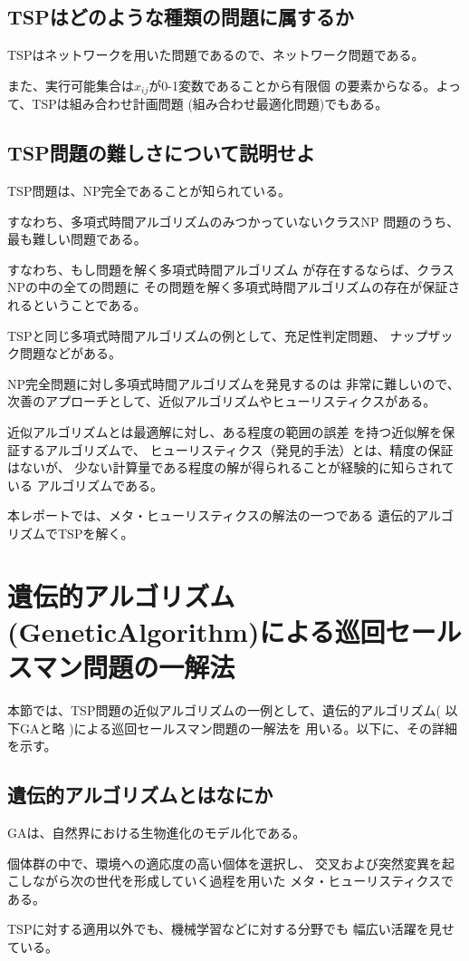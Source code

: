 \documentclass[9pt]{ltjsarticle}
\begin{document}
\subsection{TSPはどのような種類の問題に属するか}
 TSPはネットワークを用いた問題であるので、ネットワーク問題である。

 また、実行可能集合は$x_{ij}$が0-1変数であることから有限個
 の要素からなる。よって、TSPは組み合わせ計画問題
 (組み合わせ最適化問題)でもある。

 \subsection{TSP問題の難しさについて説明せよ}
 TSP問題は、NP完全であることが知られている。

 すなわち、多項式時間アルゴリズムのみつかっていないクラスNP
 問題のうち、最も難しい問題である。

 すなわち、もし問題を解く多項式時間アルゴリズム
 が存在するならば、クラスNPの中の全ての問題に
 その問題を解く多項式時間アルゴリズムの存在が保証されるということである。

 TSPと同じ多項式時間アルゴリズムの例として、充足性判定問題、
 ナップザック問題などがある。

 NP完全問題に対し多項式時間アルゴリズムを発見するのは
 非常に難しいので、
 次善のアプローチとして、近似アルゴリズムやヒューリスティクスがある。
 
 近似アルゴリズムとは最適解に対し、ある程度の範囲の誤差
 を持つ近似解を保証するアルゴリズムで、
ヒューリスティクス（発見的手法）とは、精度の保証はないが、
少ない計算量である程度の解が得られることが経験的に知らされている
アルゴリズムである。

本レポートでは、メタ・ヒューリスティクスの解法の一つである
遺伝的アルゴリズムでTSPを解く。

 \newpage
 \section{遺伝的アルゴリズム(GeneticAlgorithm)による巡回セールスマン問題の一解法}
本節では、TSP問題の近似アルゴリズムの一例として、遺伝的アルゴリズム(
    以下GAと略
)による巡回セールスマン問題の一解法を
用いる。以下に、その詳細を示す。
\subsection{遺伝的アルゴリズムとはなにか}
\begin{tcolorbox}[title=遺伝アルゴリズムの概要]
GAは、自然界における生物進化のモデル化である。

個体群の中で、環境への適応度の高い個体を選択し、
交叉および突然変異を起こしながら次の世代を形成していく過程を用いた
メタ・ヒューリスティクスである。

TSPに対する適用以外でも、機械学習などに対する分野でも
幅広い活躍を見せている。

\end{tcolorbox}
\end{document}
